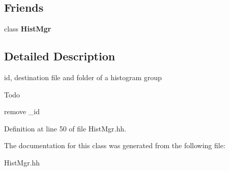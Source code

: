 \subsection*{Friends}
\begin{DoxyCompactItemize}
\item 
class {\bfseries Hist\-Mgr}\label{classhistmgr_1_1HistMgr_1_1HistogramGroupData__t_a3cc85db784d7651390e41024125eb3a0}

\end{DoxyCompactItemize}


\subsection{Detailed Description}
id, destination file and folder of a histogram group 

\begin{DoxyRefDesc}{Todo}
\item[{\bf Todo}]remove \-\_\-id \end{DoxyRefDesc}


Definition at line 50 of file Hist\-Mgr.\-hh.



The documentation for this class was generated from the following file\-:\begin{DoxyCompactItemize}
\item 
Hist\-Mgr.\-hh\end{DoxyCompactItemize}
